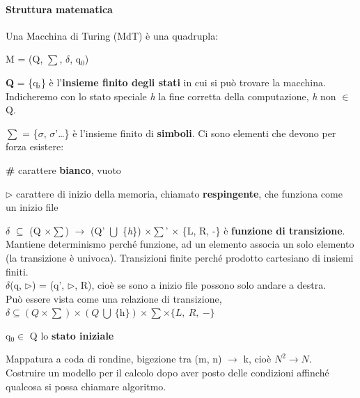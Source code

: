 \documentclass[10pt]{book}
\begin{document}
\paragraph{Struttura matematica} Una Macchina di Turing (MdT) è una quadrupla:
\begin{center}
M = (Q, $\sum$, $\delta$, q$_0$)
\end{center}
\begin{list}{}{}
	\item \textbf{Q} = \{q$_i$\} è l'\textbf{insieme finito degli stati} in cui si può trovare la macchina.\\
	Indicheremo con lo stato speciale \textit{h} la fine corretta della computazione, \textit{h} non $\in$ Q.
	\item $\sum$ = \{$\sigma$, $\sigma$'\ldots\} è l'insieme finito di \textbf{simboli}. 
	Ci sono elementi che devono per forza esistere:
	\begin{list}{}{}
		\item \textbf{\#} carattere \textbf{bianco}, vuoto
		\item $\triangleright$ carattere di inizio della memoria, chiamato \textbf{respingente}, che funziona come un inizio file
	\end{list}
	\item $\delta$ $\subseteq$ (Q $\times \sum$) $\rightarrow$ (Q' $\bigcup$ \{\textit{h}\}) $\times \sum$' $\times$ \{L, R, -\} è \textbf{funzione di transizione}.\\
	Mantiene determinismo perché funzione, ad un elemento associa un solo elemento (la transizione è univoca). Transizioni finite perché prodotto cartesiano di insiemi finiti.\\
$\delta$(q, $\triangleright$) = (q', $\triangleright$, R), cioè se sono a inizio file possono solo andare a destra.\\
Può essere vista come una relazione di transizione, $\delta \subseteq (Q \times \sum) \times (Q\:\bigcup\:\{\textit{h}\}) \times \sum \times \{L,\:R,\: -\}$
	\item q$_0 \in $ Q lo \textbf{stato iniziale} 
\end{list}
Mappatura a coda di rondine, bigezione tra (m, n) $\rightarrow$ k, cioè $N^2 \rightarrow N$.\\
Costruire un modello per il calcolo dopo aver posto delle condizioni affinché qualcosa si possa chiamare algoritmo.
\end{document}
